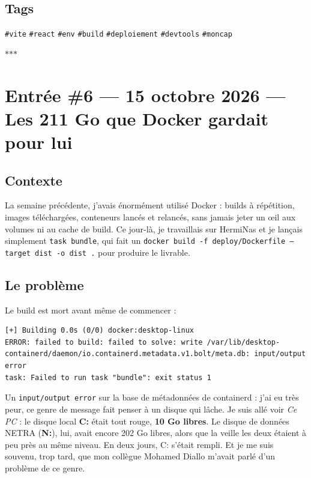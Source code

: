 \documentclass[10pt,twoside,openany]{article}
\newcommand{\entryrule}{\par\vspace{1.2em}\begin{center}\color{accentblue}$\ast$\quad$\ast$\quad$\ast$\end{center}\par}
\newcommand{\tag}[1]{\texttt{\footnotesize\color{tagolive}\#{#1}}}
\begin{document}
\subsection*{Tags}
\tag{vite} \quad \tag{react} \quad \tag{env} \quad \tag{build} \quad \tag{deploiement} \quad \tag{devtools} \quad \tag{moncap}

\entryrule

\section{Entrée \#6 --- 15 octobre 2026 --- Les 211 Go que Docker gardait pour lui}

\subsection*{Contexte}
La semaine précédente, j'avais énormément utilisé Docker : builds à répétition, images téléchargées, conteneurs lancés et relancés, sans jamais jeter un œil aux volumes ni au cache de build. Ce jour-là, je travaillais sur HermiNas et je lançais simplement \texttt{task bundle}, qui fait un \texttt{docker build -f deploy/Dockerfile --target dist -o dist .} pour produire le livrable.

\subsection*{Le problème}
Le build est mort avant même de commencer :

\begin{lstlisting}
[+] Building 0.0s (0/0) docker:desktop-linux
ERROR: failed to build: failed to solve: write /var/lib/desktop-containerd/daemon/io.containerd.metadata.v1.bolt/meta.db: input/output error
task: Failed to run task "bundle": exit status 1
\end{lstlisting}

Un \texttt{input/output error} sur la base de métadonnées de containerd : j'ai eu très peur, ce genre de message fait penser à un disque qui lâche. Je suis allé voir \textit{Ce PC} : le disque local \textbf{C:} était tout rouge, \textbf{10 Go libres}. Le disque de données NETRA (\textbf{N:}), lui, avait encore 202 Go libres, alors que la veille les deux étaient à peu près au même niveau. En deux jours, C: s'était rempli. Et je me suis souvenu, trop tard, que mon collègue Mohamed Diallo m'avait parlé d'un problème de ce genre.
\end{document}
